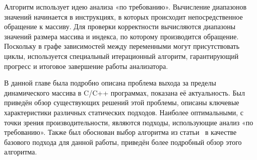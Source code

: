 Алгоритм использует идею анализа «по требованию». Вычисление
диапазонов значений начинается в инструкциях, в которых происходит
непосредственное обращение к массиву. Для проверки корректности
вычисляются диапазоны значений размера массива и индекса, по которому
производится обращение. Поскольку в графе зависимостей между
переменными могут присутствовать циклы, используется специальный
итерационный алгоритм, гарантирующий прогресс и итоговое завершение
работы анализатора.

\chapterconclusion

В данной главе была подробно описана проблема выхода за пределы
динамического массива в C/C++ программах, показана её
актуальность. Был приведён обзор существующих решений этой проблемы,
описаны ключевые характеристики различных статических
подходов. Наиболее оптимальными, с точки зрения производительности,
являются подходы, использующие анализ «по требованию». Также был обоснован
выбор алгоритма из статьи~\cite{li2010practical} в качестве базового
подхода для данной работы, приведён более подробный обзор этого
алгоритма.

\FloatBarrier
